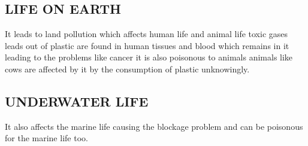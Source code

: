 \documentclass{article}
\begin{document}
\subsection{LIFE ON EARTH} %
\Large
It leads to land pollution which affects human life and animal life toxic gases leads out of plastic are found in human tissues and blood which remains in it leading to the problems like cancer it is also poisonous to animals animals like cows are affected by it by the consumption of plastic unknowingly.\newline
\subsection{UNDERWATER LIFE} %
\Large
It also affects the marine life causing the blockage problem and can be poisonous for the marine life too.\newline

\newpage
\end{document}
